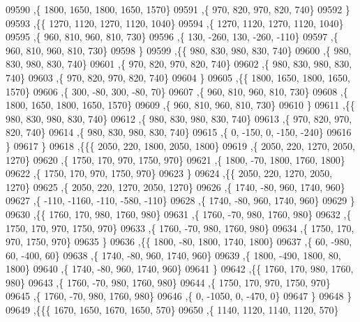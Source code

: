 \begin{DoxyCode}
09590     ,\{  1800,  1650,  1800,  1650,  1570\}
09591     ,\{   970,   820,   970,   820,   740\}
09592     \}
09593    ,\{\{  1270,  1120,  1270,  1120,  1040\}
09594     ,\{  1270,  1120,  1270,  1120,  1040\}
09595     ,\{   960,   810,   960,   810,   730\}
09596     ,\{   130,  -260,   130,  -260,  -110\}
09597     ,\{   960,   810,   960,   810,   730\}
09598     \}
09599    ,\{\{   980,   830,   980,   830,   740\}
09600     ,\{   980,   830,   980,   830,   740\}
09601     ,\{   970,   820,   970,   820,   740\}
09602     ,\{   980,   830,   980,   830,   740\}
09603     ,\{   970,   820,   970,   820,   740\}
09604     \}
09605    ,\{\{  1800,  1650,  1800,  1650,  1570\}
09606     ,\{   300,   -80,   300,   -80,    70\}
09607     ,\{   960,   810,   960,   810,   730\}
09608     ,\{  1800,  1650,  1800,  1650,  1570\}
09609     ,\{   960,   810,   960,   810,   730\}
09610     \}
09611    ,\{\{   980,   830,   980,   830,   740\}
09612     ,\{   980,   830,   980,   830,   740\}
09613     ,\{   970,   820,   970,   820,   740\}
09614     ,\{   980,   830,   980,   830,   740\}
09615     ,\{     0,  -150,     0,  -150,  -240\}
09616     \}
09617    \}
09618   ,\{\{\{  2050,   220,  1800,  2050,  1800\}
09619     ,\{  2050,   220,  1270,  2050,  1270\}
09620     ,\{  1750,   170,   970,  1750,   970\}
09621     ,\{  1800,   -70,  1800,  1760,  1800\}
09622     ,\{  1750,   170,   970,  1750,   970\}
09623     \}
09624    ,\{\{  2050,   220,  1270,  2050,  1270\}
09625     ,\{  2050,   220,  1270,  2050,  1270\}
09626     ,\{  1740,   -80,   960,  1740,   960\}
09627     ,\{  -110, -1160,  -110,  -580,  -110\}
09628     ,\{  1740,   -80,   960,  1740,   960\}
09629     \}
09630    ,\{\{  1760,   170,   980,  1760,   980\}
09631     ,\{  1760,   -70,   980,  1760,   980\}
09632     ,\{  1750,   170,   970,  1750,   970\}
09633     ,\{  1760,   -70,   980,  1760,   980\}
09634     ,\{  1750,   170,   970,  1750,   970\}
09635     \}
09636    ,\{\{  1800,   -80,  1800,  1740,  1800\}
09637     ,\{    60,  -980,    60,  -400,    60\}
09638     ,\{  1740,   -80,   960,  1740,   960\}
09639     ,\{  1800,  -490,  1800,    80,  1800\}
09640     ,\{  1740,   -80,   960,  1740,   960\}
09641     \}
09642    ,\{\{  1760,   170,   980,  1760,   980\}
09643     ,\{  1760,   -70,   980,  1760,   980\}
09644     ,\{  1750,   170,   970,  1750,   970\}
09645     ,\{  1760,   -70,   980,  1760,   980\}
09646     ,\{     0, -1050,     0,  -470,     0\}
09647     \}
09648    \}
09649   ,\{\{\{  1670,  1650,  1670,  1650,   570\}
09650     ,\{  1140,  1120,  1140,  1120,   570\}

\end{DoxyCode}

